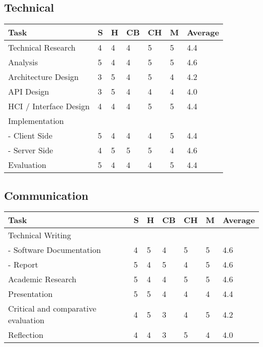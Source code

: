 \subsection{Technical} 
\begin{tabular}{ l || l | l | l | l | l || l}
  Task & S & H & CB & CH & M & Average \\ \hline
  Technical Research &  4  &  4  &  4  &  5  &  5  &  4.4 \\
  Analysis &  5  &  4  &  4  &  5  &  5  &  4.6 \\
  Architecture Design &  3  &  5  &  4  &  5  &  4  &  4.2 \\
  API Design &  3  &  5  &  4  &  4  &  4  &  4.0 \\
  HCI / Interface Design &  4  &  4  &  4  &  5  &  5  &  4.4 \\
  Implementation \\
   - Client Side &  5  &  4  &  4  &  4  &  5  &  4.4 \\
   - Server Side &  4  &  5  &  5  &  5  &  4  &  4.6 \\
  Evaluation &  5  &  4  &  4  &  4  &  5  &  4.4 \\
\end{tabular}

\subsection{Communication} 
\begin{tabular}{ l || l | l | l | l | l || l}
  Task & S & H & CB & CH & M & Average \\ \hline
  Technical Writing\\ 
   - Software Documentation &  4  &  5  &  4  &  5  &  5  &  4.6 \\
   - Report &  5  &  4  &  5  &  4  &  5  &  4.6 \\
  Academic Research &  5  &  4  &  4  &  5  &  5  &  4.6 \\
  Presentation &  5  &  5  &  4  &  4  &  4  &  4.4 \\
  Critical and comparative evaluation &  4  &  5  &  3  &  4  &  5  &  4.2 \\
  Reflection &  4  &  4  &  3  &  5  &  4  &  4.0 \\
\end{tabular}